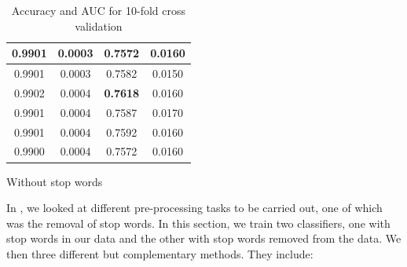 \begin{table}
\begin{subtable}{.5\linewidth}
\begin{tabular}{cccc}
      0.9901          & 0.0003        & 0.7572          & 0.0160 \\ \midrule
      0.9901          & 0.0003        & 0.7582          & 0.0150 \\
      0.9902          & 0.0004        & \textbf{0.7618} & 0.0160 \\
      0.9901          & 0.0004        & 0.7587          & 0.0170 \\
      0.9901          & 0.0004        & 0.7592          & 0.0160 \\
      0.9900          & 0.0004        & 0.7572          & 0.0160 \\ \bottomrule
    \end{tabular}
      \caption{Without stop words}
      \label{tab:data-without-stopwords}
  \end{subtable}
\caption{Accuracy and AUC for 10-fold cross validation}
\label{tab:with-without-stopwords-data-tables}
\end{table}

In , we looked at different pre-processing tasks to be
carried out, one of which was the removal of stop words. In this section, we train two classifiers,
one with stop words in our data and the other with stop words removed from the data. We then three
different but complementary methods. They include:


